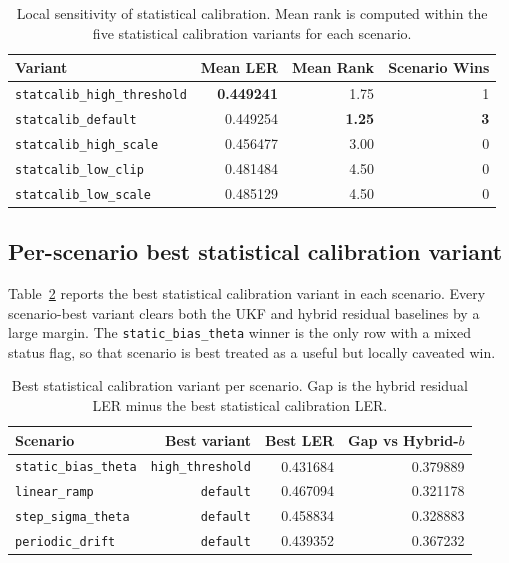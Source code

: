 \documentclass[11pt]{article}
\begin{document}
\begin{table}[ht]
\centering
\small
\begin{tabular}{lrrr}
\toprule
Variant & Mean LER & Mean Rank & Scenario Wins \\
\midrule
\texttt{statcalib\_high\_threshold} & \textbf{0.449241} & 1.75 & 1 \\
\texttt{statcalib\_default} & 0.449254 & \textbf{1.25} & \textbf{3} \\
\texttt{statcalib\_high\_scale} & 0.456477 & 3.00 & 0 \\
\texttt{statcalib\_low\_clip} & 0.481484 & 4.50 & 0 \\
\texttt{statcalib\_low\_scale} & 0.485129 & 4.50 & 0 \\
\bottomrule
\end{tabular}
\caption{Local sensitivity of statistical calibration.  Mean rank is
computed within the five statistical calibration variants for each scenario.}
\label{tab:statcalib-sensitivity}
\end{table}

\subsection{Per-scenario best statistical calibration variant}

Table~\ref{tab:statcalib-scenario-best} reports the best statistical
calibration variant in each scenario.  Every scenario-best variant clears both
the UKF and hybrid residual baselines by a large margin.  The
\texttt{static\_bias\_theta} winner is the only row with a mixed status flag,
so that scenario is best treated as a useful but locally caveated win.

\begin{table}[ht]
\centering
\small
\begin{tabular}{lrrr}
\toprule
Scenario & Best variant & Best LER & Gap vs Hybrid-\(b\) \\
\midrule
\texttt{static\_bias\_theta} & \texttt{high\_threshold} & 0.431684 & 0.379889 \\
\texttt{linear\_ramp} & \texttt{default} & 0.467094 & 0.321178 \\
\texttt{step\_sigma\_theta} & \texttt{default} & 0.458834 & 0.328883 \\
\texttt{periodic\_drift} & \texttt{default} & 0.439352 & 0.367232 \\
\bottomrule
\end{tabular}
\caption{Best statistical calibration variant per scenario.  Gap is
the hybrid residual LER minus the best statistical calibration LER.}
\label{tab:statcalib-scenario-best}
\end{table}
\end{document}
